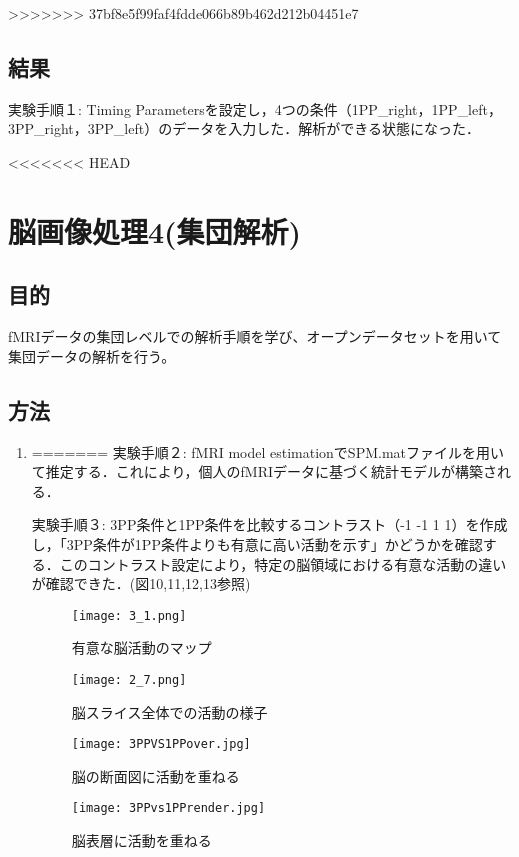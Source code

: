\documentclass{jlreq}
\begin{document}
\begin{enumerate}
\begin{enumerate}
>>>>>>> 37bf8e5f99faf4fdde066b89b462d212b04451e7

\subsection{結果}
実験手順１: Timing Parametersを設定し，4つの条件（1PP\_right，1PP\_left，3PP\_right，3PP\_left）のデータを入力した．解析ができる状態になった．

<<<<<<< HEAD
\section{脳画像処理4(集団解析)}
\subsection{目的}
fMRIデータの集団レベルでの解析手順を学び、オープンデータセットを用いて集団データの解析を行う。

\subsection{方法}
\begin{enumerate}
    \item 
=======
実験手順２: fMRI model estimationでSPM.matファイルを用いて推定する．これにより，個人のfMRIデータに基づく統計モデルが構築される．

実験手順３: 3PP条件と1PP条件を比較するコントラスト（-1 -1 1 1）を作成し，「3PP条件が1PP条件よりも有意に高い活動を示す」かどうかを確認する．このコントラスト設定により，特定の脳領域における有意な活動の違いが確認できた．(図10,11,12,13参照)

\begin{figure}[H]
    \centering
        \begin{minipage}{0.45\textwidth}
        \centering
        \texttt{[image: 3\_1.png]}
        \caption{有意な脳活動のマップ}
        \label{fig:brain_T1}
    \end{minipage}
    \hfill
    \begin{minipage}{0.45\textwidth}
        \centering
        \texttt{[image: 2\_7.png]}
        \caption{脳スライス全体での活動の様子}
        \label{fig:brain_T1}
    \end{minipage}
    \hfill
\end{figure}

\begin{figure}[H]
    \centering
        \begin{minipage}{0.45\textwidth}
        \centering
        \texttt{[image: 3PPVS1PPover.jpg]}
        \caption{脳の断面図に活動を重ねる}
        \label{fig:brain_T1}
    \end{minipage}
    \hfill
    \begin{minipage}{0.45\textwidth}
        \centering
        \texttt{[image: 3PPvs1PPrender.jpg]}
        \caption{脳表層に活動を重ねる}
        \label{fig:brain_T1}
    \end{minipage}
    \hfill
\end{figure}


\end{enumerate}
\end{enumerate}
\end{enumerate}
\end{document}
